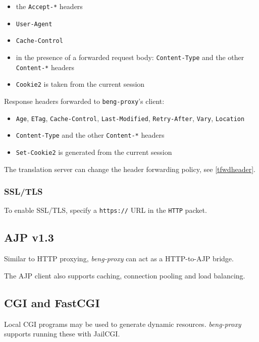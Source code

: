 \documentclass[a4paper,12pt]{article}
\begin{document}
\begin{itemize}
\item the \texttt{Accept-*} headers
\item \texttt{User-Agent}
\item \texttt{Cache-Control}
\item in the presence of a forwarded request body:
  \texttt{Content-Type} and the other \texttt{Content-*} headers
\item \texttt{Cookie2} is taken from the current session
\end{itemize}

Response headers forwarded to \texttt{beng-proxy}'s client:

\begin{itemize}
\item \texttt{Age}, \texttt{ETag}, \texttt{Cache-Control},
  \texttt{Last-Modified}, \texttt{Retry-After}, \texttt{Vary},
  \texttt{Location}
\item \texttt{Content-Type} and the other \texttt{Content-*} headers
\item \texttt{Set-Cookie2} is generated from the current session
\end{itemize}

The translation server can change the header forwarding policy, see
\ref{tfwdheader}.

\subsubsection{SSL/TLS}

To enable SSL/TLS, specify a \texttt{https://} URL in the \verb|HTTP|
packet.

\subsection{AJP v1.3}
\label{ajp}

Similar to HTTP proxying, \emph{beng-proxy} can act as a HTTP-to-AJP
bridge.

The AJP client also supports caching, connection pooling and load
balancing.

\subsection{CGI and FastCGI}
\label{cgi}

Local CGI programs may be used to generate dynamic resources.
\emph{beng-proxy} supports running these with JailCGI.
\end{document}
